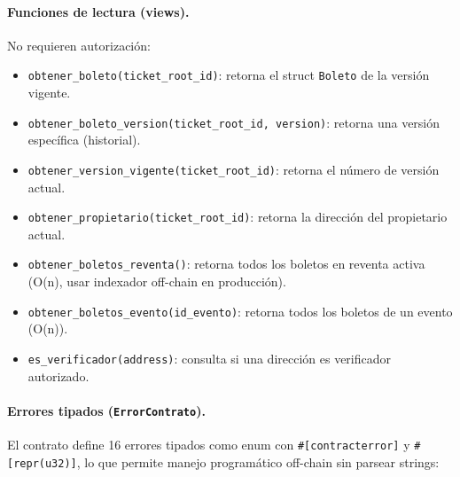 \documentclass[12pt,oneside]{article}
\begin{document}
\paragraph{Funciones de lectura (views).} No requieren autorización:

\begin{itemize}
  \item \texttt{obtener\_boleto(ticket\_root\_id)}: retorna el struct \texttt{Boleto} de la versión vigente.
  \item \texttt{obtener\_boleto\_version(ticket\_root\_id, version)}: retorna una versión específica (historial).
  \item \texttt{obtener\_version\_vigente(ticket\_root\_id)}: retorna el número de versión actual.
  \item \texttt{obtener\_propietario(ticket\_root\_id)}: retorna la dirección del propietario actual.
  \item \texttt{obtener\_boletos\_reventa()}: retorna todos los boletos en reventa activa (O(n), usar indexador off-chain en producción).
  \item \texttt{obtener\_boletos\_evento(id\_evento)}: retorna todos los boletos de un evento (O(n)).
  \item \texttt{es\_verificador(address)}: consulta si una dirección es verificador autorizado.
\end{itemize}

\paragraph{Errores tipados (\texttt{ErrorContrato}).} El contrato define 16 errores tipados como enum con \texttt{\#[contracterror]} y \texttt{\#[repr(u32)]}, lo que permite manejo programático off-chain sin parsear strings:
\end{document}
